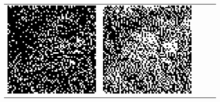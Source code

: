 \begin{figure}
\begin{tabular}{c c c c c}
		\includegraphics[width=\tilewidth,interpolate=false]{media/chp2/associative_memory/hopfield/05_02_activation_scaled_crushed.png}&%
		\includegraphics[width=\tilewidth,interpolate=false]{media/chp2/associative_memory/hopfield/05_03_activation_scaled_crushed.png}&%

\end{tabular}
\end{figure}
